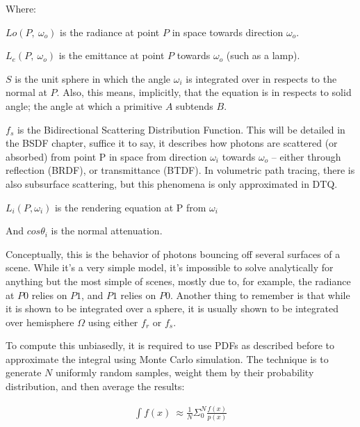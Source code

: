 \documentclass{article}
\begin{document}
  Where:
  \begin{list}{}{}
  	 \item $Lo(P,\:\omega_o)$ is the radiance at point $P$ in space towards direction $\omega_o$. 
  	 
  	 \item $L_e(P,\:\omega_o)$ is the emittance at point $P$ towards $\omega_o$
      (such as a lamp).
  	 
  	 
  	 \item $S$ is the unit sphere in which the angle $\omega_i$ is integrated
        over in respects to the normal at $P$. Also, this means, implicitly,
        that the equation is in respects to solid angle; the angle at which a
        primitive $A$ subtends $B$.
  	 
  	 \item $f_s$ is the Bidirectional Scattering Distribution Function. This
        will be detailed in the BSDF chapter, suffice it to say, it describes
        how photons are scattered (or absorbed) from point P in space from
        direction $\omega_i$ towards $\omega_o$ -- either through reflection
        (BRDF), or transmittance (BTDF). In volumetric path tracing, there is
        also subsurface scattering, but this phenomena is only approximated in
        DTQ.
  	 
  	 \item $L_i(P, \omega_i)$ is the rendering equation at P from $\omega_i$
  	 
  	 \item And $cos\theta_i$ is the normal attenuation.
  \end{list}
  Conceptually, this is the behavior of photons bouncing off several surfaces of
a scene. While it's a very simple model, it's impossible to solve analytically
for anything but the most simple of scenes, mostly due to, for example, the
radiance at $P0$ relies on $P1$, and $P1$ relies on $P0$. Another thing to
remember is that while it is shown to be integrated over a sphere, it is usually
shown to be integrated over hemisphere $\Omega$ using either $f_r$ or $f_s$.
  
  To compute this unbiasedly, it is required to use PDFs as described before to
approximate the integral using Monte Carlo simulation. The technique is to
generate $N$ uniformly random samples, weight them by their probability
distribution, and then average the results:
  
  \begin{align}
   \int{f(x)} \: \approx \frac{1}{N}\Sigma_0^N{\frac{f(x)}{p(x)}}
  \end{align}
  
\end{document}
